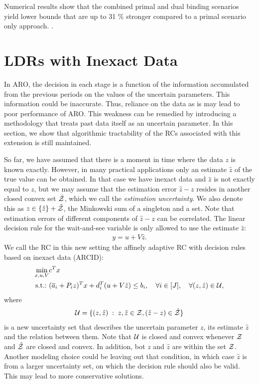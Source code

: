 Numerical results show that the combined primal and dual binding scenarios  yield lower bounds that are up to 31 \% stronger compared to a primal scenario only approach. .


\section{LDRs with Inexact Data}

In ARO, the decision in each stage is a function of the information accumulated from the previous periods on the values of the uncertain parameters. This information could be inaccurate. Thus, reliance on the data as is may lead to poor performance of ARO. This weakness can be remedied by introducing a methodology that treats past data itself as an uncertain parameter. In this section, we show that algorithmic tractability of the RCs associated with this extension is still maintained.

So far, we have assumed that there is a moment in time where the data $z$ is known exactly. However, in many practical applications only an estimate $\hat{z}$ of the true value can be obtained. In that case we have inexact data and $\hat{z}$ is not exactly equal to $z$, but we may assume that the estimation error $\hat{z}-z$ resides in another closed convex set $\hat{\mathcal{Z}}$, which we call the \textit{estimation uncertainty}. We also denote this as $z\in\{\hat{z}\}+\hat{\mathcal{Z}}$, the Minkowski sum of a singleton and a set. Note that estimation errors of different components of $\hat{z}-z$ can be correlated. The linear decision rule for the wait-and-see variable is only allowed to use the estimate $\hat{z}$:
\begin{align*}
y = u + V\hat{z}.
\end{align*}
We call the RC in this new setting the affinely adaptive RC with decision rules based on inexact data (ARCID):
\begin{align}\label{p3c6:ARCID}
\min\limits_{x,u,V} & c^Tx \\
\mathop{\text{s.t.:~}} & (\overline{ a }_i+P_iz)^Tx + d_i^T(u+V\hat{z}) \leq b_i, \quad \forall i\in [J],\quad\forall(z,\hat{z})\in\mathcal{U},
\end{align}
where
\begin{align}\label{p3c6:ARCID-U}
\mathcal{U} = \{(z,\hat{z})\; : \; z,\hat{z}\in\mathcal{Z}, (\hat{z}-z)\in\hat{\mathcal{Z}}\}
\end{align}
is a new uncertainty set that describes the uncertain parameter $z$, its estimate $\hat{z}$ and the relation between them. Note that $\mathcal{U}$ is closed and convex whenever $\mathcal{Z}$ and $\hat{\mathcal{Z}}$ are closed and convex. In addition, bot $z$ and $\hat{z}$ are within the set $\mathcal{Z}$. Another modeling choice could be leaving out that condition, in which case $\hat{z}$ is from a larger uncertainty set, on which the decision rule should also be valid. This may lead to more conservative solutions.

